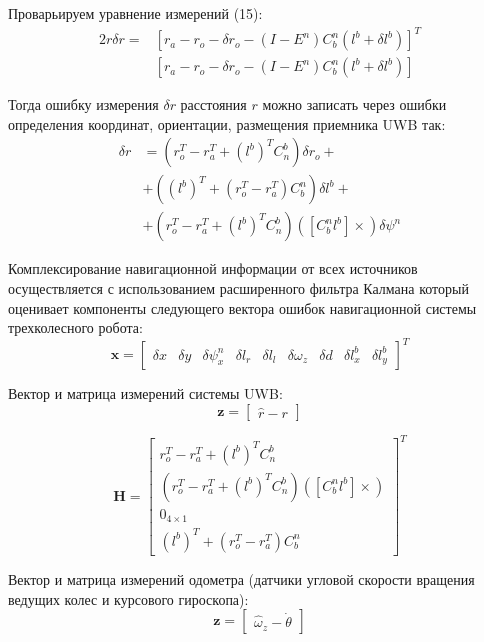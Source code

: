 \documentclass[14pt]{article}
\begin{document}
Проварьируем уравнение измерений (15):
\begin{align}
   2r\delta r=&\left[r_a -r_o-\delta r_o-\left(I-E^n\right)C_b^n\left(l^b+\delta l^b\right)\right]^T \\ &\left[r_a - r_o-\delta r_o-\left(I-E^n\right)C_b^n\left(l^b+\delta l^b\right)\right]
\end{align}

Тогда ошибку измерения $ \delta r$ расстояния $r$ можно записать через ошибки определения координат, ориентации, размещения  приемника  UWB так:
 \begin{align}
   \delta r &= \left(r_o^T-r_a^T+\left(l^b\right)^TC_n^b\right)  \delta r_o+\\&+\left((l^b)^T+\left(r_o^T-r_a^T\right)C_b^n\right)\delta l^b+\\&+\left(r_o^T-r_a^T+  \left(l^b\right)^TC_n^b\right)\left(\left[C_b^nl^b\right]\times\right)\delta\psi^n
\end{align}

Комплексирование навигационной информации от всех источников осуществляется с использованием расширенного фильтра Калмана который оценивает компоненты следующего вектора ошибок навигационной системы трехколесного робота:
\begin{equation}
 \mathbf x = \begin{bmatrix}\delta x & \delta y & \delta\psi^n_x & \delta l_r & \delta l_l & \delta\omega_z & \delta d & \delta l^b_x & \delta l^b_y  \end{bmatrix}^T
 \end{equation}
   
Вектор и матрица измерений системы UWB:
\begin{equation}
 \mathbf z = \begin{bmatrix}\hat r-r\end{bmatrix}
 \end{equation}
   
\begin{equation}
\mathbf H = \begin{bmatrix} 
r_o^T-r_a^T+\left(l^b\right)^TC_n^b \\ \left(r_o^T-r_a^T+\left(l^b\right)^TC_n^b\right)\left(\left[C_b^nl^b\right]\times\right)  \\ 0_{4 \times 1} \\ \left(l^b\right)^T+\left(r_o^T-r_a^T\right)C_b^n 
\end{bmatrix}^T
\end{equation}

Вектор и матрица измерений одометра (датчики угловой скорости вращения ведущих колес и курсового гироскопа):
 \begin{equation}
   \mathbf z = \begin{bmatrix}\hat{\omega}_z-\dot\theta\end{bmatrix}
 \end{equation}
   
\end{document}
